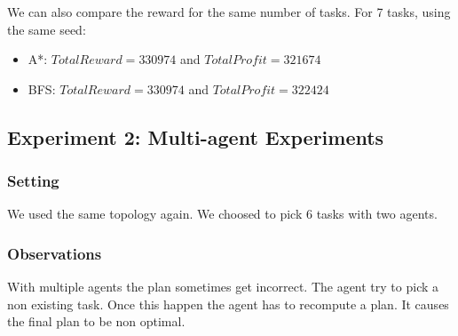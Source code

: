 \documentclass[11pt]{article}
\begin{document}
We can also compare the reward for the same number of tasks. For 7 tasks, using the same seed:
\begin{itemize}
\item A*: $TotalReward = 330974$ and $TotalProfit = 321674$
\item BFS: $TotalReward = 330974$ and $TotalProfit = 322424$
\end{itemize}

\subsection{Experiment 2: Multi-agent Experiments}

\subsubsection{Setting}
We used the same topology again. We choosed to pick 6 tasks with two agents.

\subsubsection{Observations}
With multiple agents the plan sometimes get incorrect. The agent try to pick a non existing task. Once this happen the agent has to recompute a plan. It causes the final plan to be non optimal. 
\end{document}
